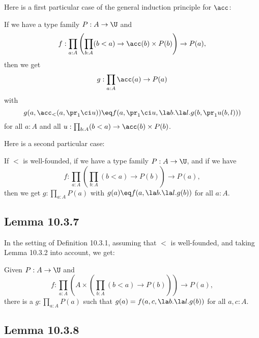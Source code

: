 \documentclass[12pt]{article}
\begin{document}



Here is a first particular case of the general induction principle for $\acc$:

If we have a type family $P:A\to\U$ and %
$$
f:\prod_{a:A}\left(\prod_{b:A}(b<a)\to\acc(b)\times P(b)\right)\to P(a),%
$$ 
then we get 
$$
g:\prod_{a:A}\acc(a)\to P(a)
$$
with
$$
g(a,\acc_<(a,\pr_1\ci u))\eq f(a,\pr_1\ci u,\la b.\la l.g(b,\pr_1 u(b,l)))
$$
for all $a:A$ and all $u:\prod_{b:A}(b<a)\to\acc(b)\times P(b)$. 

Here is a second particular case:

If $<$ is well-founded, if we have a type family $P:A\to\U$, and if we have 
$$
f:\prod_{a:A}\left(\prod_{b:A}(b<a)\to P(b)\right)\to P(a),
$$
then we get $g:\prod_{a:A}P(a)$ with $g(a)\eq f(a,\la b.\la l.g(b))$ for all $a:A$.


\subsection{Lemma 10.3.7}\label{s1037}

In the setting of Definition 10.3.1, assuming that $<$ is well-founded, and taking Lemma 10.3.2 into account, we get:

Given $P:A\to\U$ and
$$%
f:\prod_{a:A}\left(A\times\left(\prod_{b:A}(b<a)\to P(b)\right)\right)\to P(a),
$$%
there is a $g:\prod_{a:A}P(a)$ such that $g(a)=f(a,c,\la b.\la l.g(b))$ for all $a,c:A$.


\subsection{Lemma 10.3.8}
\end{document}

